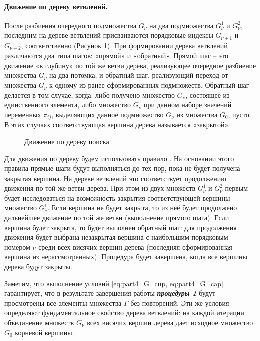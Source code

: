 \paragraph{Движение по дереву ветвлений.}

После разбиения очередного подмножества $G_\nu$ на два подмножества $G^1_\nu$  и $G^2_\nu$, последним на дереве ветвлений присваиваются порядковые индексы $G_{\nu+1}$ и $G_{\nu+2}$, соответственно (Рисунок \ref{fig:part2_tree_traversal}).
При формировании дерева ветвлений различаются два типа шагов: «прямой» и «обратный». Прямой шаг -- это движение «в глубину» по той же ветви дерева, реализующее очередное разбиение множества $G_\nu$ на два потомка, и обратный шаг, реализующий переход от множества $G_\nu$  к одному из ранее сформированных подмножеств. Обратный шаг делается в том случае, когда: либо получено множество $G_\nu$, состоящее из единственного элемента, либо множество $G_\nu$  при данном наборе значений переменных $\pi_{ij}$, выделяющих данное подмножество $G_\nu$ из множества $G_0$, пусто. В этих случаях соответствующая вершина дерева называется «закрытой».

\begin{figure}[ht]
  \caption{Движение по дереву поиска}\label{fig:part2_tree_traversal}
\end{figure}

Для движения по дереву будем использовать правило . На основании этого правила прямые шаги будут выполняться до тех пор, пока не будет получена закрытая вершина. На дереве ветвлений это соответствует продолжению движения по той же ветви дерева. При этом из двух множеств $G^1_\nu$  и $G^2_\nu$ первым будет исследоваться на возможность закрытия соответствующей вершины множество $G^1_\nu$. Если вершина не будет закрыта, то из неё будет продолжено дальнейшее движение по той же ветви (выполнение прямого шага). Если вершина будет закрыта, то будет выполнен обратный шаг: для продолжения движения будет выбрана незакрытая вершина с наибольшим порядковым номером $\nu$ среди всех висячих вершин дерева (последняя сформированная вершина из нерассмотренных). Процедура будет завершена, когда все вершины дерева будут закрыты.

Заметим, что выполнение условий \cref{eq:part4_G_cup, eq:part4_G_cap} гарантирует, что в результате завершения работы \textit{\textbf{процедуры 1}} будут просмотрены все элементы множества $\Gamma$ без повторений. Эти же условия определяют фундаментальное свойство дерева ветвлений: на каждой итерации объединение множеств $G_\nu$ всех висячих вершин дерева дает исходное множество $G_0$ корневой вершины.

